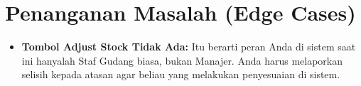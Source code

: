 \section{Penanganan Masalah (Edge Cases)}
\begin{itemize}
    \item \textbf{Tombol Adjust Stock Tidak Ada:} Itu berarti peran Anda di sistem saat ini hanyalah Staf Gudang biasa, bukan Manajer. Anda harus melaporkan selisih kepada atasan agar beliau yang melakukan penyesuaian di sistem.
\end{itemize}
